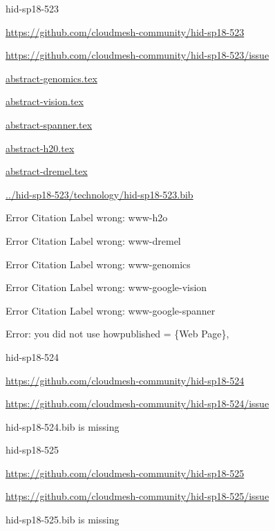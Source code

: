 \begin{IU}

hid-sp18-523

\url{https://github.com/cloudmesh-community/hid-sp18-523}

\url{https://github.com/cloudmesh-community/hid-sp18-523/issue}

\href{https://github.com/cloudmesh-community/hid-sp18-523/blob/master//technology/abstract-genomics.tex}{abstract-genomics.tex}

\href{https://github.com/cloudmesh-community/hid-sp18-523/blob/master//technology/abstract-vision.tex}{abstract-vision.tex}

\href{https://github.com/cloudmesh-community/hid-sp18-523/blob/master//technology/abstract-spanner.tex}{abstract-spanner.tex}

\href{https://github.com/cloudmesh-community/hid-sp18-523/blob/master//technology/abstract-h20.tex}{abstract-h20.tex}

\href{https://github.com/cloudmesh-community/hid-sp18-523/blob/master//technology/abstract-dremel.tex}{abstract-dremel.tex}

\href{https://github.com/cloudmesh-community/hid-sp18-523/blob/master//technology/hid-sp18-523.bib}{../hid-sp18-523/technology/hid-sp18-523.bib}

 Error Citation Label wrong: www-h2o

 Error Citation Label wrong: www-dremel

 Error Citation Label wrong: www-genomics

 Error Citation Label wrong: www-google-vision

 Error Citation Label wrong: www-google-spanner

Error: you did not use howpublished = \{Web Page\},

\end{IU}


\begin{IU}

hid-sp18-524

\url{https://github.com/cloudmesh-community/hid-sp18-524}

\url{https://github.com/cloudmesh-community/hid-sp18-524/issue}

hid-sp18-524.bib is missing

\end{IU}


\begin{IU}

hid-sp18-525

\url{https://github.com/cloudmesh-community/hid-sp18-525}

\url{https://github.com/cloudmesh-community/hid-sp18-525/issue}

hid-sp18-525.bib is missing

\end{IU}


